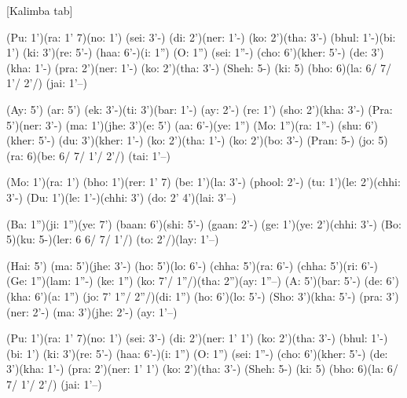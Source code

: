 \documentclass[11pt]{article}
\begin{document}
[Kalimba tab]
\begin{jianpu}
(Pu: 1')(ra: 1' 7)(no: 1') (sei: 3'-) (di: 2')(ner: 1'-) (ko: 2')(tha: 3'-)
(bhul: 1'-)(bi: 1') (ki: 3')(re: 5'-) (haa: 6'-)(i: 1'')
(O: 1'') (sei: 1''-) (cho: 6')(kher: 5'-) (de: 3')(kha: 1'-) (pra: 2')(ner: 1'-) (ko: 2')(tha: 3'-)
(Sheh: 5-) (ki: 5) (bho: 6)(la: 6/ 7/ 1'/ 2'/) (jai: 1'--)

(Ay: 5') (ar: 5') (ek: 3'-)(ti: 3')(bar: 1'-) (ay: 2'-) (re: 1') (sho: 2')(kha: 3'-)
(Pra: 5')(ner: 3'-) (ma: 1')(jhe: 3')(e: 5') (aa: 6'-)(ye: 1'')
(Mo: 1'')(ra: 1''-) (shu: 6')(kher: 5'-) (du: 3')(kher: 1'-) (ko: 2')(tha: 1'-) (ko: 2')(bo: 3'-)
(Pran: 5-) (jo: 5)(ra: 6)(be: 6/ 7/ 1'/ 2'/) (tai: 1'--)

(Mo: 1')(ra: 1') (bho: 1')(rer: 1' 7) (be: 1')(la: 3'-) (phool: 2'-) (tu: 1')(le: 2')(chhi: 3'-)
(Du: 1')(le: 1'-)(chhi: 3') (do: 2' 4')(lai: 3'--)

(Ba: 1'')(ji: 1'')(ye: 7') (baan: 6')(shi: 5'-) (gaan: 2'-) (ge: 1')(ye: 2')(chhi: 3'-)
(Bo: 5)(ku: 5-)(ler: 6 6/ 7/ 1'/) (to: 2'/)(lay: 1'--)

(Hai: 5') (ma: 5')(jhe: 3'-) (ho: 5')(lo: 6'-) (chha: 5')(ra: 6'-) (chha: 5')(ri: 6'-)
(Ge: 1'')(lam: 1''-) (ke: 1'') (ko: 7'/ 1''/)(tha: 2'')(ay: 1''--)
(A: 5')(bar: 5'-) (de: 6')(kha: 6')(a: 1'') (jo: 7' 1''/ 2''/)(di: 1'') (ho: 6')(lo: 5'-)
(Sho: 3')(kha: 5'-) (pra: 3')(ner: 2'-) (ma: 3')(jhe: 2'-) (ay: 1'--)

(Pu: 1')(ra: 1' 7)(no: 1') (sei: 3'-) (di: 2')(ner: 1' 1') (ko: 2')(tha: 3'-)
(bhul: 1'-)(bi: 1') (ki: 3')(re: 5'-) (haa: 6'-)(i: 1'')
(O: 1'') (sei: 1''-) (cho: 6')(kher: 5'-) (de: 3')(kha: 1'-) (pra: 2')(ner: 1' 1') (ko: 2')(tha: 3'-)
(Sheh: 5-) (ki: 5) (bho: 6)(la: 6/ 7/ 1'/ 2'/) (jai: 1'--)
\end{jianpu}
\end{document}

